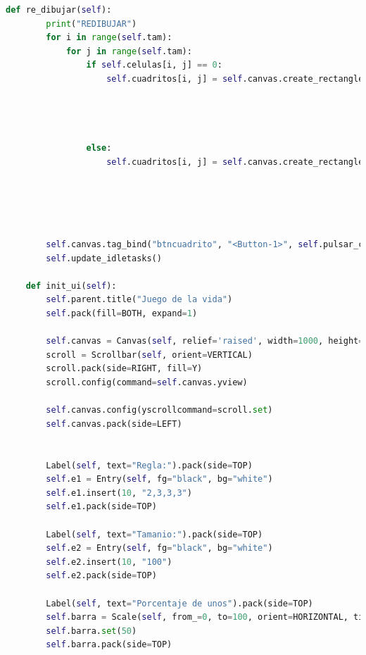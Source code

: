 \begin{lstlisting}[language=Python]
    def re_dibujar(self):
        print("REDIBUJAR")
        for i in range(self.tam):
            for j in range(self.tam):
                if self.celulas[i, j] == 0:
                    self.cuadritos[i, j] = self.canvas.create_rectangle(0 + (j * self.tam_cuadro),
                                                                        0 + (i * self.tam_cuadro),
                                                                        self.tam_cuadro + (j * self.tam_cuadro),
                                                                        self.tam_cuadro + (i * self.tam_cuadro),
                                                                        fill=self.ceros, width=0, tag="btncuadrito")
                else:
                    self.cuadritos[i, j] = self.canvas.create_rectangle(0 + (j * self.tam_cuadro),
                                                                        0 + (i * self.tam_cuadro),
                                                                        self.tam_cuadro + (j * self.tam_cuadro),
                                                                        self.tam_cuadro + (i * self.tam_cuadro),
                                                                        fill=self.unos, width=0, tag="btncuadrito")

        self.canvas.tag_bind("btncuadrito", "<Button-1>", self.pulsar_cuadrito)
        self.update_idletasks()

    def init_ui(self):
        self.parent.title("Juego de la vida")
        self.pack(fill=BOTH, expand=1)

        self.canvas = Canvas(self, relief='raised', width=1000, height=1000)
        scroll = Scrollbar(self, orient=VERTICAL)
        scroll.pack(side=RIGHT, fill=Y)
        scroll.config(command=self.canvas.yview)

        self.canvas.config(yscrollcommand=scroll.set)
        self.canvas.pack(side=LEFT)


        Label(self, text="Regla:").pack(side=TOP)
        self.e1 = Entry(self, fg="black", bg="white")
        self.e1.insert(10, "2,3,3,3")
        self.e1.pack(side=TOP)

        Label(self, text="Tamanio:").pack(side=TOP)
        self.e2 = Entry(self, fg="black", bg="white")
        self.e2.insert(10, "100")
        self.e2.pack(side=TOP)

        Label(self, text="Porcentaje de unos").pack(side=TOP)
        self.barra = Scale(self, from_=0, to=100, orient=HORIZONTAL, tickinterval=50)
        self.barra.set(50)
        self.barra.pack(side=TOP)


\end{lstlisting}
